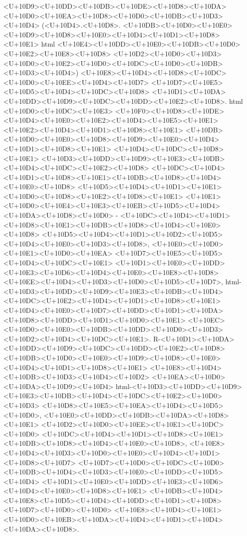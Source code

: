 \documentclass{article}
\begin{document}
<U+10D9><U+10DD><U+10DB><U+10DE><U+10D8><U+10DA><U+10D0><U+10EA><U+10D8><U+10D0><U+10DB><U+10D3><U+10D4> (<U+10D4>.<U+10D8>. <U+10DB><U+10D0><U+10E0><U+10D9><U+10D8><U+10E0><U+10D4><U+10D1><U+10D8><U+10E1> html <U+10E4><U+10DD><U+10E0><U+10DB><U+10D0><U+10E2><U+10E8><U+10D8> <U+10D2><U+10D0><U+10D3><U+10D0><U+10E2><U+10D0><U+10DC><U+10D0><U+10DB><U+10D3><U+10D4>) <U+10E8><U+10D4><U+10D8><U+10DC><U+10D0><U+10EE><U+10D4><U+10D7> <U+10D7><U+10E5><U+10D5><U+10D4><U+10DC><U+10D8> <U+10D1><U+10DA><U+10DD><U+10D9><U+10DC><U+10DD><U+10E2><U+10D8>. html <U+10D0><U+10DC><U+10E3> <U+10F0><U+10D8><U+10DE><U+10D4><U+10E0><U+10E2><U+10D4><U+10E5><U+10E1><U+10E2><U+10D4><U+10D1><U+10D8><U+10E1> <U+10DB><U+10D0><U+10E0><U+10D8><U+10D9><U+10E0><U+10D4><U+10D1><U+10D8><U+10E1> <U+10D4><U+10DC><U+10D8><U+10E1> <U+10D3><U+10DD><U+10D9><U+10E3><U+10DB><U+10D4><U+10DC><U+10E2><U+10D8> <U+10DC><U+10D4><U+10D1><U+10D8><U+10E1><U+10DB><U+10D8><U+10D4><U+10E0><U+10D8> <U+10D5><U+10D4><U+10D1><U+10E1><U+10D0><U+10D8><U+10E2><U+10D8><U+10E1> <U+10E1><U+10D0><U+10E4><U+10E3><U+10EB><U+10D5><U+10D4><U+10DA><U+10D8><U+10D0> - <U+10DC><U+10D4><U+10D1><U+10D8><U+10E1><U+10DB><U+10D8><U+10D4><U+10E0><U+10D8> <U+10D5><U+10D4><U+10D1><U+10D2><U+10D5><U+10D4><U+10E0><U+10D3><U+10D8>, <U+10E0><U+10D0><U+10E1><U+10D0><U+10EA> <U+10D7><U+10E5><U+10D5><U+10D4><U+10DC><U+10E1> <U+10D1><U+10E0><U+10DD><U+10E3><U+10D6><U+10D4><U+10E0><U+10E8><U+10D8> <U+10EE><U+10D4><U+10D3><U+10D0><U+10D5><U+10D7>, html-<U+10D3><U+10DD><U+10D9><U+10E3><U+10DB><U+10D4><U+10DC><U+10E2><U+10D4><U+10D1><U+10D8><U+10E1> <U+10D4><U+10E0><U+10D7><U+10DD><U+10D1><U+10DA><U+10D8><U+10DD><U+10D1><U+10D0><U+10E1> <U+10EC><U+10D0><U+10E0><U+10DB><U+10DD><U+10D0><U+10D3><U+10D2><U+10D4><U+10DC><U+10E1>. R-<U+10D1><U+10DA><U+10DD><U+10D9><U+10DC><U+10DD><U+10E2><U+10D8> <U+10DB><U+10D0><U+10E0><U+10D9><U+10D8><U+10E0><U+10D4><U+10D1><U+10D8><U+10E1> <U+10E8><U+10D4><U+10DB><U+10D3><U+10D4><U+10D2> <U+10EA><U+10D0><U+10DA><U+10D9><U+10D4> html-<U+10D3><U+10DD><U+10D9><U+10E3><U+10DB><U+10D4><U+10DC><U+10E2><U+10D0><U+10D3> <U+10D8><U+10E5><U+10EA><U+10D4><U+10D5><U+10D0>, <U+10E0><U+10DD><U+10DB><U+10DA><U+10D8><U+10E1> <U+10D2><U+10D0><U+10EE><U+10E1><U+10DC><U+10D0> <U+10DC><U+10D4><U+10D1><U+10D8><U+10E1><U+10DB><U+10D8><U+10D4><U+10E0><U+10D8>, <U+10E8><U+10D4><U+10D3><U+10D0><U+10E0><U+10D4><U+10D1><U+10D8><U+10D7> <U+10D7><U+10D0><U+10DC><U+10D0><U+10DB><U+10D4><U+10D3><U+10E0><U+10DD><U+10D5><U+10D4> <U+10D1><U+10E0><U+10DD><U+10E3><U+10D6><U+10D4><U+10E0><U+10D8><U+10E1> <U+10DB><U+10D4><U+10E8><U+10D5><U+10D4><U+10DD><U+10D1><U+10D8><U+10D7><U+10D0><U+10D0> <U+10E8><U+10D4><U+10E1><U+10D0><U+10EB><U+10DA><U+10D4><U+10D1><U+10D4><U+10DA><U+10D8>.
\end{document}
